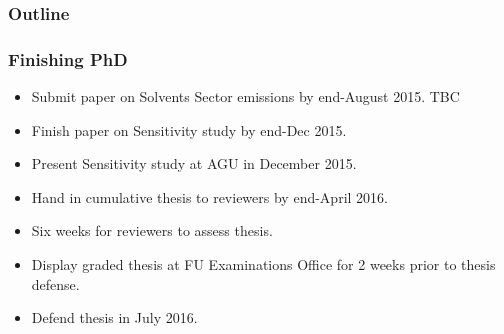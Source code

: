 \begin{frame}
    \frametitle{Outline} 
    \tableofcontents[currentsection]
\end{frame} 

\begin{frame}
    \frametitle{Finishing PhD}

    \begin{itemize}
        \item Submit paper on Solvents Sector emissions by end-August 2015. TBC
        \item Finish paper on Sensitivity study by end-Dec 2015.
        \item Present Sensitivity study at AGU in December 2015.
        \item Hand in cumulative thesis to reviewers by end-April 2016.
        \item Six weeks for reviewers to assess thesis.
        \item Display graded thesis at FU Examinations Office for 2 weeks prior to thesis defense.
        \item Defend thesis in July 2016.
    \end{itemize}
\end{frame}
